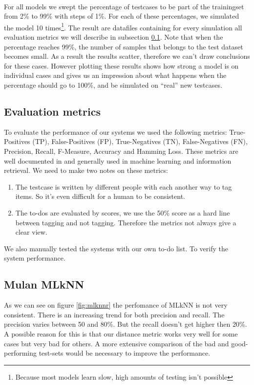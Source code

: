 \documentclass[a4paper,titlepage]{article}
\begin{document}
\paragraph{}
For all models we swept the percentage of testcases to be part of the trainingset from 2\% to 99\% with steps of 1\%. For each of these percentages, we simulated the model 10 times\footnote{Because most models learn slow, high amounts of testing isn't possible}. The result are datafiles containing for every simulation all evaluation metrics we will describe in subsection \ref{ss:evalmetrics}. Note that when the percentage reaches 99\%, the number of samples that belongs to the test dataset becomes small. As a result the results scatter, therefore we can't draw conclusions for these cases. However plotting these results shows how strong a model is on individual cases and gives us an impression about what happens when the percentage should go to 100\%, and be simulated on ``real'' new testcases.
\subsection{Evaluation metrics}
\label{ss:evalmetrics}
To evaluate the performance of our systems we used the following metrics: True-Positives (TP), False-Positives (FP), True-Negatives (TN), False-Negatives (FN), Precision, Recall, F-Measure, Accuracy and Hamming Loss. These metrics are well documented in \cite{Francis99performancemeasures} and generally used in machine learning and information retrieval. We need to make two notes on these metrics:
\begin{enumerate}
 \item The testcase is written by different people with each another way to tag items. So it's even difficult for a human to be consistent.
 \item The to-dos are evaluated by scores, we use the 50\% score as a hard line between tagging and not tagging. Therefore the metrics not always give a clear view.
\end{enumerate}
We also manually tested the systems with our own to-do list. To verify the system performance.

\subsection{Mulan MLkNN}
As we can see on figure \ref{fig:mlknnr} the perfomance of MLkNN is not very consistent. There is an increasing trend for both precision and recall. The precision varies between 50 and 80\%. But the recall doesn't get higher then 20\%. A possible reason for this is that our distance metric works very well for some cases but very bad for others. A more extensive comparison of the bad and good-performing test-sets would be necessary to improve the performance.
\end{document}

